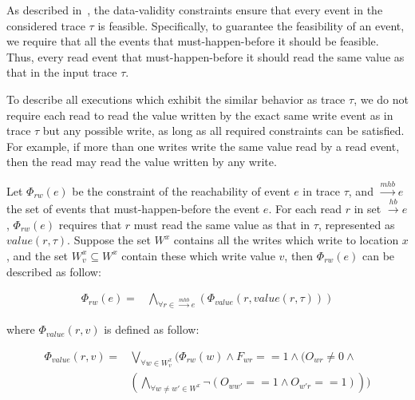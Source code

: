 \documentclass[preprint, numbers, 10pt]{sigplanconf}
\begin{document}
As described in~\cite{Huang:2015}, the data-validity constraints
ensure that every event in the considered trace $\tau$ is feasible. 
Specifically, to guarantee the feasibility of an event, we require that
all the events that must-happen-before it should be feasible. Thus,
every read event that must-happen-before it should read the same value
as that in the input trace $\tau$.  

To describe all executions which exhibit the similar behavior as trace $\tau$, 
we do not require each read to read the value written by the exact same write event
as in trace $\tau$ but any possible write, as long as all required constraints
can be satisfied. For example, if more than one writes write the same value read
by a read event, then the read may read the value written by any write.  

Let $\Phi_{rw}(e)$ be the constraint of the reachability of event $e$ in trace $\tau$,
and  $\stackrel{mhb}{\longrightarrow} e$ the set of events that must-happen-before
the event $e$. For each read $r$ in set  $\stackrel{hb}{\longrightarrow} e$, $\Phi_{rw}(e)$
requires that $r$ must read the same value as that in $\tau$, represented as $value(r, \tau)$. 
Suppose the set $W^x$ contains all the writes which write to location $x$, 
and the set $W_v^x\subseteq W^x$ contain these which write value $v$, then
$\Phi_{rw}(e)$ can be described as follow: 

\begin{equation}
\begin{aligned}
\Phi_{rw}(e) ={} & \bigwedge_{\forall r\in \stackrel{mhb}{\longrightarrow} e} 
					(\Phi_{value}(r,value(r,\tau)))
\end{aligned}
\end{equation} 

where $\Phi_{value}(r,v)$ is defined as follow: 

\begin{equation}
\begin{aligned}
\Phi_{value}(r,v) ={} & \bigvee_{\forall w\in W_v^x} (\Phi_{rw}(w)\wedge F_{wr}==1\wedge 
					  (O_{wr}\neq 0\wedge \\
					& (\bigwedge_{\forall w\neq w'\in W^x}\neg (O_{ww'}==1\wedge O_{w'r}==1)))
\end{aligned}
\end{equation}
\end{document}

